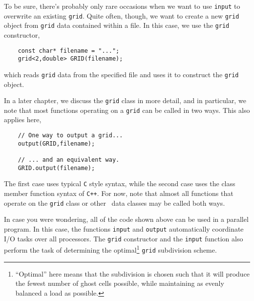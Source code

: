 To be sure, there's probably only rare occasions when we want to use {\tt input} to overwrite an existing {\tt grid}.  Quite often, though, we want to create a new {\tt grid} object from {\tt grid} data contained within a file.  In this case, we use the {\tt grid} constructor,
\begin{shadebox}
\begin{verbatim}
    const char* filename = "...";
    grid<2,double> GRID(filename);
\end{verbatim}
\end{shadebox}
which reads {\tt grid} data from the specified file and uses it to construct the {\tt grid} object.

In a later chapter, we discuss the {\tt grid} class in more detail, and in particular, we note that most functions operating on a {\tt grid} can be called in two ways.  This also applies here,
\begin{shadebox}
\begin{verbatim}
    // One way to output a grid...
    output(GRID,filename);

    // ... and an equivalent way.
    GRID.output(filename);
\end{verbatim}
\end{shadebox}
The first case uses typical {\tt C} style syntax, while the second case uses the class member function syntax of {\tt C++}.  For now, note that almost all functions that operate on the {\tt grid} class or other \MMSP\ data classes may be called both ways.

In case you were wondering, all of the code shown above can be used in a parallel program.  In this case, the functions {\tt input} and {\tt output} automatically coordinate I/O tasks over all processors.  The {\tt grid} constructor and the {\tt input} function also perform the task of determining the optimal\footnote{``Optimal'' here means that the subdivision is chosen such that it will produce the fewest number of ghost cells possible, while maintaining as evenly balanced a load as possible.} {\tt grid} subdivision scheme.  


